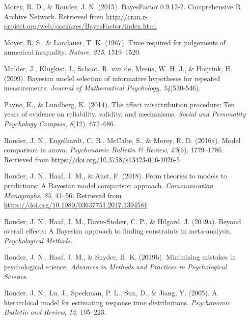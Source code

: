 \documentclass[english,,man]{apa6}
\begin{document}
\leavevmode\hypertarget{ref-Morey:Rouder:BayesFactorPackage}{}%
Morey, R. D., \& Rouder, J. N. (2015). BayesFactor 0.9.12-2. Comprehensive R Archive Network. Retrieved from \url{http://cran.r-project.org/web/packages/BayesFactor/index.html}

\leavevmode\hypertarget{ref-Moyer:Landauer:1967}{}%
Moyer, R. S., \& Landauer, T. K. (1967). Time required for judgements of numerical inequality. \emph{Nature}, \emph{215}, 1519--1520.

\leavevmode\hypertarget{ref-Mulder:etal:2009}{}%
Mulder, J., Klugkist, I., Schoot, R. van de, Meeus, W. H. J., \& Hoijtink, H. (2009). Bayesian model selection of informative hypotheses for repeated measurements. \emph{Journal of Mathematical Psychology}, \emph{54}(530-546).

\leavevmode\hypertarget{ref-Payne:Lundberg:2014}{}%
Payne, K., \& Lundberg, K. (2014). The affect misattribution procedure: Ten years of evidence on reliability, validity, and mechanisms. \emph{Social and Personality Psychology Compass}, \emph{8}(12), 672--686.

\leavevmode\hypertarget{ref-Rouder:etal:2016d}{}%
Rouder, J. N., Engelhardt, C. R., McCabe, S., \& Morey, R. D. (2016a). Model comparison in anova. \emph{Psychonomic Bulletin \& Review}, \emph{23}(6), 1779--1786. Retrieved from \url{https://doi.org/10.3758/s13423-016-1026-5}

\leavevmode\hypertarget{ref-Rouder:etal:2018}{}%
Rouder, J. N., Haaf, J. M., \& Aust, F. (2018). From theories to models to predictions: A Bayesian model comparison approach. \emph{Communication Monographs}, \emph{85}, 41--56. Retrieved from \url{https://doi.org/10.1080/03637751.2017.1394581}

\leavevmode\hypertarget{ref-Rouder:etal:2019b}{}%
Rouder, J. N., Haaf, J. M., Davis-Stober, C. P., \& Hilgard, J. (2019a). Beyond overall effects: A Bayesian approach to finding constraints in meta-analysis. \emph{Psychological Methods}.

\leavevmode\hypertarget{ref-Rouder:etal:2019a}{}%
Rouder, J. N., Haaf, J. M., \& Snyder, H. K. (2019b). Minimizing mistakes in psychological science. \emph{Advances in Methods and Practices in Psychological Science}.

\leavevmode\hypertarget{ref-Rouder:etal:2005a}{}%
Rouder, J. N., Lu, J., Speckman, P. L., Sun, D., \& Jiang, Y. (2005). A hierarchical model for estimating response time distributions. \emph{Psychonomic Bulletin and Review}, \emph{12}, 195--223.
\end{document}
